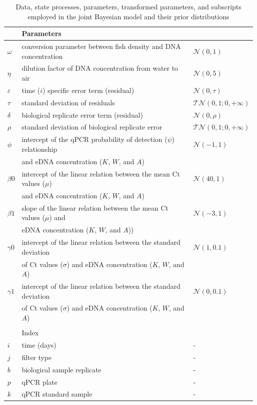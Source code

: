 \documentclass{article}
\begin{document}
\begin{table}[h]
\begin{tabular}{lll}
&Parameters&\\
\hline
$\omega$& conversion parameter between fish density
and DNA concentration & $\mathcal{N}(0,1)$\\
$\eta$& dilution factor of DNA concentration
from water to air & $\mathcal{N}(0,5)$\\
$\varepsilon$& time ($i$) specific error term (residual) & $\mathcal{N}(0,\tau)$\\
$\tau$& standard deviation of residuals & $\mathcal{TN}(0,1;0, +\infty)$\\
$\delta$& biological replicate error term (residual) & $\mathcal{N}(0,\rho)$\\
$\rho$& standard deviation of biological replicate error & $\mathcal{TN}(0,1;0, +\infty)$\\
$\phi$& intercept of the qPCR probability of detection ($\psi$) relationship &$\mathcal{N}(-1,1)$\\
& and eDNA concentration ($K$, $W$, and $A$) \\
$\beta0$& intercept of the linear relation between the mean Ct values ($\mu$)&$\mathcal{N}(40,1)$\\
&and eDNA concentration ($K$, $W$, and $A$) & \\
$\beta1$& slope of the linear relation between the mean Ct values ($\mu$) and &$\mathcal{N}(-3,1)$\\
&eDNA concentration ($K$, $W$, and $A$)) & \\
$\gamma0$& intercept of the linear relation between the standard deviation&$\mathcal{N}(1,0.1)$\\
&of Ct values ($\sigma$) and eDNA concentration ($K$, $W$, and $A$) & \\
$\gamma1$& intercept of the linear relation between the standard deviation &$\mathcal{N}(0,0.1)$\\
&of Ct values ($\sigma$) and eDNA concentration ($K$, $W$, and $A$) & \\
&&\\
&Index&\\
\hline
$i$& time (days) & -\\
$j$& filter type & -\\
$b$& biological sample replicate & -\\
$p$& qPCR plate & -\\
$k$& qPCR standard sample & -\\


    \end{tabular}
    \caption{Data, state processes, parameters, transformed parameters, and subscripts employed in the joint Bayesian model and their prior distributions}
    \label{tab:priortable}
\end{table}
\end{document}
